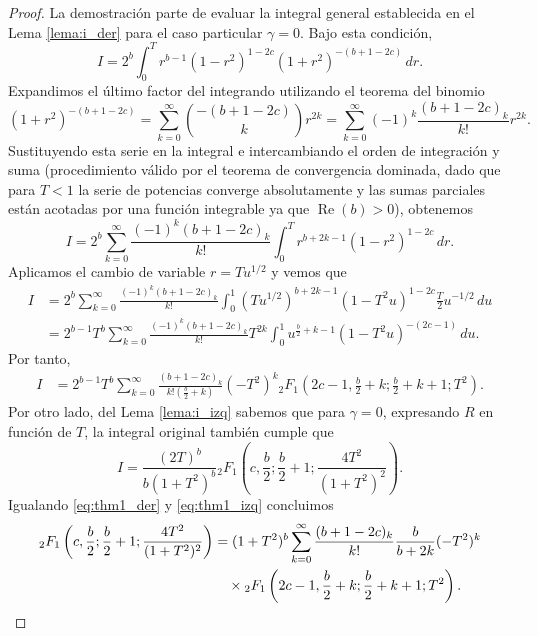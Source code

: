 \documentclass[12pt,a4paper]{book}
\begin{document}
\begin{proof}
La demostración parte de evaluar la integral general establecida en el Lema \ref{lema:i_der} para el caso particular $\gamma = 0$. Bajo esta condición, 
\[
    I = 2^b \int_{0}^{T} r^{b-1} (1-r^2)^{1-2c} (1+r^2)^{-(b+1-2c)} \, dr.
\]
Expandimos el último factor del integrando utilizando el teorema del binomio
\[
    (1+r^2)^{-(b+1-2c)} = \sum_{k=0}^{\infty} \binom{-(b+1-2c)}{k} r^{2k} = \sum_{k=0}^{\infty} (-1)^k \frac{(b+1-2c)_k}{k!} r^{2k}.
\]
Sustituyendo esta serie en la integral e intercambiando el orden de integración y suma (procedimiento válido por el teorema de convergencia dominada, dado que para $T < 1$ la serie de potencias converge absolutamente y las sumas parciales están acotadas por una función integrable ya que $\operatorname{Re}(b) > 0$), obtenemos
\[
    I = 2^b \sum_{k=0}^{\infty} \frac{(-1)^k (b+1-2c)_k}{k!} \int_{0}^{T} r^{b+2k-1} (1-r^2)^{1-2c} \, dr.
\]
Aplicamos el cambio de variable $r = T u^{1/2}$ y vemos que
\begin{align*}
    I &= 2^b \sum_{k=0}^{\infty} \frac{(-1)^k (b+1-2c)_k}{k!} \int_{0}^{1} \left(T u^{1/2}\right)^{b+2k-1} \left(1 - T^2 u\right)^{1-2c} \frac{T}{2} u^{-1/2} \, du \\
    &= 2^{b-1} T^b \sum_{k=0}^{\infty} \frac{(-1)^k (b+1-2c)_k}{k!} T^{2k} \int_{0}^{1} u^{\frac{b}{2}+k-1} (1 - T^2 u)^{-(2c-1)} \, du.
\end{align*}
Por tanto,
\begin{equation}
\label{eq:thm1_der}
\begin{aligned}
    I &= 2^{b-1} T^b \sum_{k=0}^{\infty} \frac{(b+1-2c)_k}{k! \left(\frac{b}{2}+k\right)} (-T^2)^{k} {}_{2}F_{1}\left(2c-1, \frac{b}{2}+k; \frac{b}{2}+k+1; T^2\right).
\end{aligned}
\end{equation}
Por otro lado, del Lema \ref{lema:i_izq} sabemos que para $\gamma = 0$, expresando $R$ en función de $T$, la integral original también cumple que
\begin{equation}
\label{eq:thm1_izq}
    I = \frac{(2T)^b}{b (1+T^2)^b} {}_{2}F_{1}\left(c, \frac{b}{2}; \frac{b}{2}+1; \frac{4T^2}{(1+T^2)^2}\right).
\end{equation}
Igualando \eqref{eq:thm1_der} y \eqref{eq:thm1_izq} concluimos
\begin{align*}
    {}_{2}F_{1}\left(c, \frac{b}{2}; \frac{b}{2}+1; \frac{4T^2}{(1+T^2)^2}\right) &= (1+T^2)^b \sum_{k=0}^{\infty} \frac{(b+1-2c)_k}{k!} \frac{b}{b+2k}  (-T^2)^{k} \\
    &\quad \times {}_{2}F_{1}\left(2c-1, \frac{b}{2}+k; \frac{b}{2}+k+1; T^2\right). \qedhere
\end{align*}
\end{proof}
\end{document}
